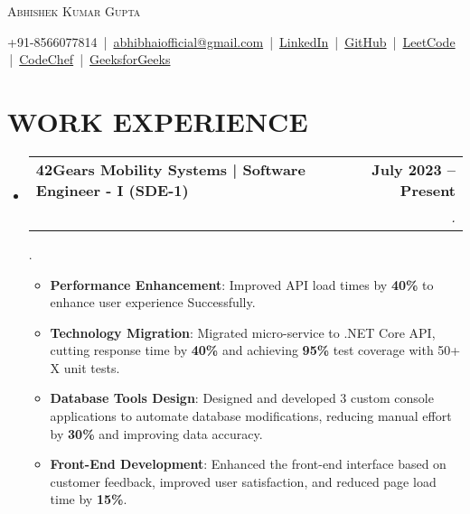\documentclass[letterpaper,11pt]{article}
\makeatletter
\newcommand{\resumeItem}[1]{
  \item\small{
    {#1 \vspace{-2pt}}
  }
}
\newcommand{\resumeSubheading}[4]{
  \vspace{-2pt}\item
    \begin{tabular*}{1.0\textwidth}[t]{l@{\extracolsep{\fill}}r}
      \textbf{\large#1} & \textbf{\small #2} \\
      \textit{\large#3} & \textit{\small #4} \\
      
    \end{tabular*}\vspace{-7pt}
}
\newcommand{\resumeSubHeadingListStart}{\begin{itemize}[leftmargin=0.0in, label={}]}
\newcommand{\resumeSubHeadingListEnd}{\end{itemize}}
\newcommand{\resumeItemListStart}{\begin{itemize}}
\newcommand{\resumeItemListEnd}{\end{itemize}\vspace{-5pt}}
\makeatother
\begin{document}


\begin{center}
{\Huge \scshape Abhishek Kumar Gupta} \\ \vspace{6pt}

\small 
+91-8566077814 \,|\, 
\href{mailto:abhibhaiofficial@gmail.com}{abhibhaiofficial@gmail.com} \,|\, 
\href{https://linkedin.com/in/abhishek-kumar-gupta-727a681bb/}{LinkedIn} \,|\, 
\href{https://github.com/abhikumar002}{GitHub} \,|\, 
\href{https://leetcode.com/abhibhaiofficial}{LeetCode} \,|\, 
\href{https://www.codechef.com/users/codeabhi_123}{CodeChef} \,|\, 
\href{https://auth.geeksforgeeks.org/user/abhibhaiofficial/}{GeeksforGeeks}
\end{center}

\vspace{-2pt}

\section{WORK EXPERIENCE}
    \resumeSubHeadingListStart
        \resumeSubheading{ \href{https://www.linkedin.com/feed/update/urn:li:activity:6892339573460926464/} \large{{42Gears Mobility Systems  | Software Engineer - I (SDE-1)}}}{July 2023 -- Present}{\vspace{-15pt}}{.}
        {\vspace{-15pt}}{.}
        \vspace{2pt}
            \resumeItemListStart
 \resumeItem{\normalsize{{\textbf{\large{Performance Enhancement}}}: Improved API load times by \textbf{40\%} to enhance user experience Successfully.}}

 \resumeItem{\normalsize{{\textbf{\large{Technology Migration}}}: Migrated micro-service to .NET Core API, cutting response time by \textbf{40\%} and achieving \textbf{95\%} test coverage with 50+ X unit tests.}}

 \resumeItem{\normalsize{{\textbf{\large{Database Tools Design}}}: Designed and developed 3 custom console applications to automate database modifications, reducing manual effort by \textbf{30\%} and improving data accuracy.}}

  \resumeItem{\normalsize{{\textbf{\large{Front-End Development}}}: Enhanced the front-end interface based on customer feedback, improved user satisfaction, and reduced page load time by \textbf{15\%}.}}
            \resumeItemListEnd
    \resumeSubHeadingListEnd
\end{document}
